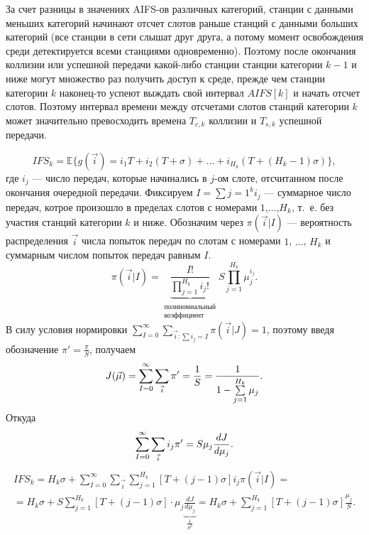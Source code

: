 За счет разницы в значениях AIFS-ов различных категорий, станции с данными меньших категорий начинают отсчет слотов раньше станций с данными больших категорий (все станции в сети слышат друг друга, а потому момент освобождения среди детектируется всеми станциями одновременно). Поэтому после окончания коллизии или успешной передачи какой-либо станции станции категории $k-1$ и ниже могут множество раз получить доступ к среде, прежде чем станции категории $k$ наконец-то успеют выждать свой интервал $AIFS[k]$ и начать отсчет слотов. Поэтому интервал времени между отсчетами слотов станций категории $k$ может значительно превосходить времена $T_{c,k}$ коллизии и $T_{s,k}$ успешной передачи.

\begin{equation}
IFS_k = \mathbb{E}\{g(\vec{i}) = i_1T+i_2(T+\sigma) + \dots + i_{H_k}(T+(H_k-1)\sigma)\},
\end{equation}
где $i_j$ --- число передач, которые начинались в $j$-ом слоте, отсчитанном после окончания очередной передачи. Фиксируем $I=\sum\limits{j=1}^{k}i_j$ --- суммарное число передач, котрое произошло в пределах слотов с номерами $1$,$\dots$,$H_k$, т.~е. без участия станций категории $k$ и ниже.
Обозначим через $\pi(\vec{i}|I)$ --- вероятность распределения $\vec{i}$ числа попыток передач по слотам с номерами $1$, $\dots$, $H_k$ и суммарным числом попыток передач равным $I$.
\begin{equation}
\pi(\vec{i}|I) = \underbrace{\frac{I!}{\prod\limits_{j=1}^{H_k}i_j!}}_{\substack{\text{полиномиальный}\\ \text{коэффициент}}} S\prod\limits_{j=1}^{H_k} \mu_j^{i_j}.
\end{equation}
В силу условия нормировки $\sum\limits_{I = 0}^{\infty}\sum\limits_{\vec{i}\colon\sum\limits i_j = I}\pi(\vec{i}|J) = 1$, поэтому введя обозначение $\pi'=\frac{\pi}{S}$, получаем
\begin{equation}
\notag
J(\vec{\mu}) = \sum\limits_{I = 0}^{\infty}\sum\limits_{\vec{i}} \pi' = \frac{1}{S} = \frac{1}{1-\sum\limits_{j=1}^{H_k} \mu_j}.
\end{equation}
Откуда 
\begin{equation}
\notag
\sum\limits_{I = 0}^{\infty}\sum\limits_{\vec{i}} i_j\pi' = S\mu_j\frac{dJ}{d\mu_j}.
\end{equation}
\begin{gather}
IFS_k = H_k\sigma + \sum\limits_{I = 0}^{\infty} \sum\limits_{\vec{i}} \sum\limits_{j=1}^{H_k} [T+(j-1)\sigma]i_j\pi(\vec{i}|I) = \\ = H_k\sigma + 
S\sum\limits_{j=1}^{H_k}[T+(j-1)\sigma] \cdot \mu_j \underbrace{\frac{dJ}{d\mu_j}}_{\frac{1}{S^2}} = H_k \sigma + \sum\limits_{j=1}^{H_k}[T+(j-1)\sigma]\frac{\mu_j}{S}.
\end{gather}
